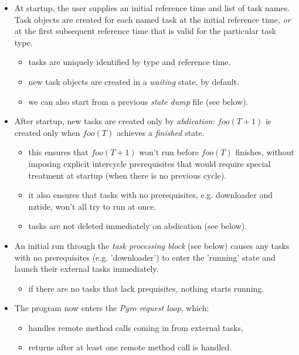 \documentclass[12pt]{article}
\begin{document}
\begin{itemize}
    \item At startup, the user supplies an initial reference time and
    list of task names. Task objects are created for each named task at
    the initial reference time, {\em or} at the first subsequent
    reference time that is valid for the particular task type.
    \begin{itemize}
        \item tasks are uniquely identified by type and reference time. 
        \item new task objects are created in a {\em waiting} state, by
        default.
        \item we can also start from a previous {\em state dump} file
        (see below).
    \end{itemize}

\item After startup, new tasks are created only by {\em abdication}:
$foo(T+1)$ is created only when $foo(T)$ achieves a {\em finished} state.
    \begin{itemize}
    \item this ensures that $foo(T+1)$ won't run before $foo(T)$
    finishes, without imposing explicit intercycle prerequisites
    that would require special treatment at startup (when there is no
    previous cycle). 
    \item it also ensures that tasks with no prerequisites, e.g.
    downloader and nztide, won't all try to run at once.
    \item tasks are not deleted immediately on abdication (see below). 
    \end{itemize}

\item An initial run through the {\em task processing block} (see below)
causes any tasks with no prerequisites (e.g. 'downloader') to enter the
'running' state and launch their external tasks immediately.
    \begin{itemize}
    \item if there are no tasks that lack prequisites, nothing starts running.
    \end{itemize}

\item The program now enters the {\em Pyro request loop}, which:

    \begin{itemize}
    \item handles remote method calls coming in from external tasks, 
    \item returns after at least one remote method call is handled. 
    \end{itemize}


\end{itemize}
\end{document}
